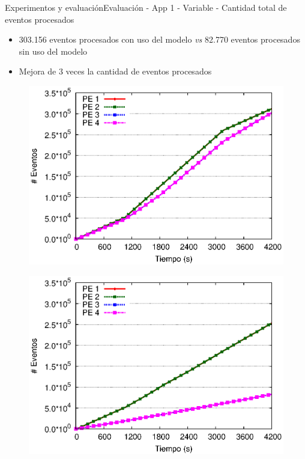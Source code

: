 \begin{frame}{Experimentos y evaluación}{Evaluación - App 1 - Variable - Cantidad total de eventos procesados}

\begin{itemize}
\item 303.156 eventos procesados con uso del modelo \textit{vs} 82.770 eventos procesados sin uso del modelo
\item Mejora de 3 veces la cantidad de eventos procesados
\end{itemize}

\begin{multicols}{2}
\begin{figure}[p]
	\centering
	\includegraphics[scale=0.475]{images/exp/app1/normal/cm/eventCount.eps}
\end{figure}

\begin{figure}[p]
	\centering
	\includegraphics[scale=0.475]{images/exp/app1/normal/sm/eventCount.eps}
\end{figure}
\end{multicols}
\end{frame}

